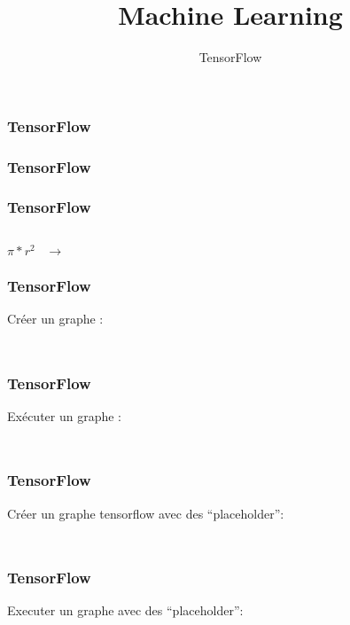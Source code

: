 \documentclass{formation}
\title{Machine Learning}
\subtitle{TensorFlow}
\begin{document}
\begin{frame}
  \frametitle{TensorFlow}
\end{frame}

\begin{frame}
  \frametitle{TensorFlow}
\end{frame}

\begin{frame}
  \frametitle{TensorFlow}
  \begin{minipage}[l]{0.15\linewidth}
      $\;$
  \end{minipage}\hfill
  \begin{minipage}[l]{0.35\linewidth}
    \huge
    \begin{center}
      $\pi*r^2\;\;\;\rightarrow$
    \end{center}
  \end{minipage}\hfill
  \begin{minipage}[l]{0.49\linewidth}
  \end{minipage}\hfill
\end{frame}

\begin{frame}
  \frametitle{TensorFlow}
  Créer un graphe :
  \inputminted[linenos,fontsize=\small,bgcolor=pythonbg]{python}{code-illustration/tf-create_graph.py}
  \inputminted[linenos,fontsize=\small,bgcolor=returnbg]{text}{code-illustration/tf-create_graph.txt}
\end{frame}

\begin{frame}
  \frametitle{TensorFlow}
  Exécuter un graphe :
  \inputminted[linenos,fontsize=\small,bgcolor=pythonbg]{python}{code-illustration/tf-run_graph.py}
  \inputminted[linenos,fontsize=\small,bgcolor=returnbg]{text}{code-illustration/tf-run_graph.txt}
\end{frame}

\begin{frame}
  \frametitle{TensorFlow}
  Créer un graphe tensorflow avec des ``placeholder'':
  \inputminted[linenos,fontsize=\small,bgcolor=pythonbg]{python}{code-illustration/tf-create_graph_placeholder.py}
  \inputminted[linenos,fontsize=\small,bgcolor=returnbg]{text}{code-illustration/tf-create_graph_placeholder.txt}
\end{frame}

\begin{frame}
  \frametitle{TensorFlow}
  Executer un graphe avec des ``placeholder'':
  \inputminted[linenos,fontsize=\small,bgcolor=pythonbg]{python}{code-illustration/tf-run_graph_placeholder.py}
  \inputminted[linenos,fontsize=\small,bgcolor=returnbg]{text}{code-illustration/tf-run_graph_placeholder.txt}
\end{frame}
\end{document}

